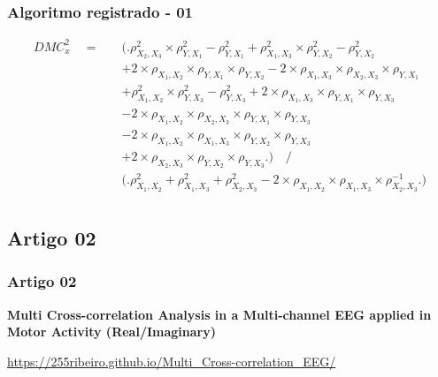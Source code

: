 \documentclass[11pt, aspectratio=169]{beamer}
\begin{document}
\begin{frame}
  \frametitle{Algoritmo registrado - 01}

  \begin{equation}
    \begin{split}
      DMC_{x}^{2} \quad = \quad & \Big( \Big. \rho^{2}_{X_{2},X_{3}} \times \rho^{2}_{Y,X_{1}}- \rho^{2}_{Y,X_{1}} + \rho^{2}_{X_{1},X_{3}}\times \rho^{2}_{Y,X_{2}}-\rho^{2}_{Y,X_{2}} \\
      &+ 2 \times \rho_{X_{1},X_{2}} \times \rho_{Y,X_{1}} \times \rho_{Y,X_{2}}   - 2 \times \rho_{X_{1},X_{3}} \times \rho_{X_{2},X_{3}} \times \rho_{Y,X_{1}} \\
      &+ \rho^{2}_{X_{1},X_{2}} \times \rho^{2}_{Y,X_{3}}-\rho^{2}_{Y,X_{3}} + 2 \times \rho_{X_{1},X_{3}} \times \rho_{Y,X_{1}} \times \rho_{Y,X_{3}} \\
      &- 2 \times \rho_{X_{1},X_{2}} \times \rho_{X_{2},X_{3}} \times \rho_{Y,X_{1}} \times \rho_{Y,X_{3}} \\
      &- 2 \times \rho_{X_{1},X_{2}} \times \rho_{X_{1},X_{3}} \times \rho_{Y,X_{2}} \times \rho_{Y,X_{3}} \\
      &+ 2 \times \rho_{X_{2},X_{3}} \times \rho_{Y,X_{2}} \times \rho_{Y,X_{3}} \Big. \Big)    \quad \Big/ \\
      & \Big( \Big. \rho^{2}_{X_{1},X_{2}} + \rho^{2}_{X_{1},X_{3}} + \rho^{2}_{X_{2},X_{3}} - 2 \times \rho_{X_{1},X_{2}} \times \rho_{X_{1},X_{3}} \times \rho_{X_{2},X_{3}}^{-1}\Big. \Big)  \\
    \end{split}
    \label{eq:dmc_3x_y}
  \end{equation}

\end{frame}

\subsection{Artigo 02}

\begin{frame}
  \frametitle{Artigo 02}

  \textbf{\Large{Multi Cross-correlation Analysis in a Multi-channel EEG applied in Motor Activity (Real/Imaginary)}}
  \medskip
  \begin{center}
    \url{https://255ribeiro.github.io/Multi_Cross-correlation_EEG/}
  \end{center}
 

\end{frame}
\end{document}

